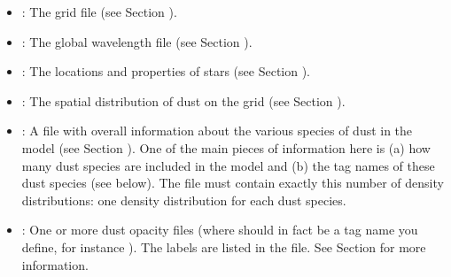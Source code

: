 \documentclass[letterpaper,10pt,english]{sphinxmanual}
\begin{document}
\begin{itemize}
\item {} 
: The grid file (see Section {\hyperref[\detokenize{inputoutputfiles:sec-grid-input}]{}}).

\item {} 
: The global wavelength file (see Section
{\hyperref[\detokenize{inputoutputfiles:sec-wavelengths}]{}}).

\item {} 
: The locations and properties of stars (see Section
{\hyperref[\detokenize{inputoutputfiles:sec-stars}]{}}).

\item {} 
: The spatial distribution of dust on the grid (see
Section {\hyperref[\detokenize{inputoutputfiles:sec-dustdens}]{}}).

\item {} 
: A file with overall information about the various species of
dust in the model (see Section {\hyperref[\detokenize{inputoutputfiles:sec-opacities}]{}}).  One of the main pieces
of information here is (a) how many dust species are included in the model
and (b) the tag names of these dust species (see 
below). The file  must contain exactly this number of
density distributions: one density distribution for each dust species.

\item {} 
: One or more dust opacity files (where  should in
fact be a tag name you define, for instance ). The
labels are listed in the  file. See Section
{\hyperref[\detokenize{inputoutputfiles:sec-opacities}]{}} for more information.


\end{itemize}
\end{document}
